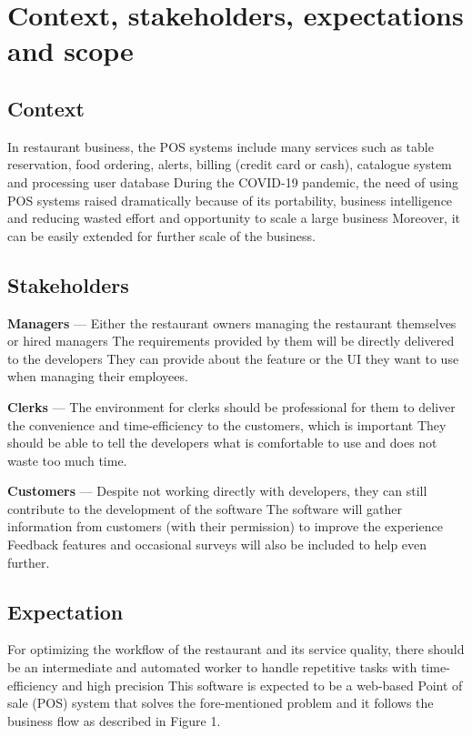 \section{Context, stakeholders, expectations and scope}
\subsection{Context}
In restaurant business, the POS systems include many services such as table reservation, food ordering, alerts, billing (credit card or cash), catalogue system and processing user database
During the COVID-19 pandemic, the need of using POS systems raised dramatically because of its portability, business intelligence and reducing wasted effort and opportunity to scale a large business
Moreover, it can be easily extended for further scale of the business.

\subsection{Stakeholders}
\textbf{Managers} --- Either the restaurant owners managing the restaurant themselves or hired managers
The requirements provided by them will be directly delivered to the developers
They can provide about the feature or the UI they want to use when managing their employees.

\textbf{Clerks} --- The environment for clerks should be professional for them to deliver the convenience and time-efficiency to the customers, which is important
They should be able to tell the developers what is comfortable to use and does not waste too much time.

\textbf{Customers} --- Despite not working directly with developers, they can still contribute to the development of the software
The software will gather information from customers (with their permission) to improve the experience
Feedback features and occasional surveys will also be included to help even further.

\subsection{Expectation}
For optimizing the workflow of the restaurant and its service quality, there should be an intermediate and automated worker to handle repetitive tasks with time-efficiency and high precision
This software is expected to be a web-based Point of sale (POS) system that solves the fore-mentioned problem and it follows the business flow as described in Figure 1.

